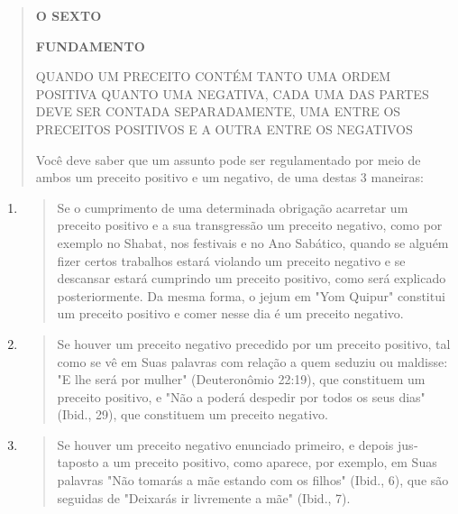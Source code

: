 \begin{quote}
\textbf{O SEXTO}

\textbf{FUNDAMENTO}

QUANDO UM PRECEITO CONTÉM TANTO UMA ORDEM POSITIVA QUANTO UMA NEGATIVA,
CADA UMA DAS PARTES DEVE SER CONTADA SEPARADAMENTE, UMA ENTRE OS
PRECEITOS POSITIVOS E A OUTRA ENTRE OS NEGATIVOS

Você deve saber que um assunto pode ser regulamentado por meio de ambos
um preceito positivo e um negativo, de uma destas 3 maneiras:
\end{quote}

\begin{enumerate}
\def\labelenumi{\arabic{enumi}.}
\item
  \begin{quote}
  Se o cumprimento de uma determinada obrigação acarretar um preceito
  positivo e a sua transgressão um preceito negativo, como por exem­plo
  no Shabat, nos festivais e no Ano Sabático, quando se alguém fizer
  certos trabalhos estará violando um preceito negativo e se descansar
  estará cumprin­do um preceito positivo, como será explicado
  posteriormente. Da mesma for­ma, o jejum em "Yom Quipur" constitui um
  preceito positivo e comer nesse dia é um preceito negativo.
  \end{quote}
\item
  \begin{quote}
  Se houver um preceito negativo precedido por um preceito posi­tivo,
  tal como se vê em Suas palavras com relação a quem seduziu ou
  maldisse: "E lhe será por mulher" (Deuteronômio 22:19), que constituem
  um preceito positivo, e "Não a poderá despedir por todos os seus dias"
  (Ibid., 29), que cons­tituem um preceito negativo.
  \end{quote}
\item
  \begin{quote}
  Se houver um preceito negativo enunciado primeiro, e depois
  jus­taposto a um preceito positivo, como aparece, por exemplo, em Suas
  palavras "Não tomarás a mãe estando com os filhos" (Ibid., 6), que são
  seguidas de "Dei­xarás ir livremente a mãe" (Ibid., 7).
  \end{quote}
\end{enumerate}

